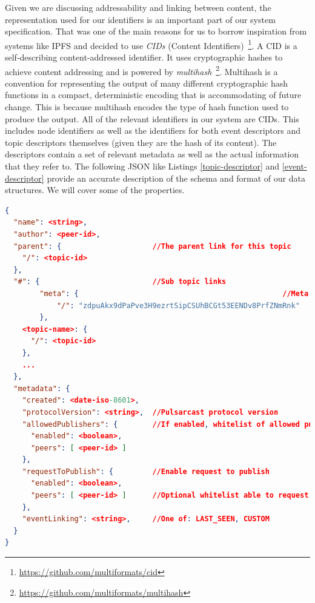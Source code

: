 Given we are discussing addressability and linking between content, the
representation used for our identifiers is an important part of our system
specification. That was one of the main reasons for us to borrow inspiration
from systems like IPFS and decided to use \emph{CIDs} (Content
Identifiers)~\footnote{\url{https://github.com/multiformats/cid}}.  A CID is a
self-describing content-addressed identifier. It uses cryptographic hashes to
achieve content addressing and is powered by
\emph{multihash}~\footnote{\url{https://github.com/multiformats/multihash}}.
Multihash is a convention for representing the output of many different
cryptographic hash functions in a compact, deterministic encoding that is
accommodating of future change. This is because multihash encodes the type of
hash function used to produce the output. All of the relevant identifiers in
our system are CIDs. This includes node identifiers as well as the identifiers
for both event descriptors and topic descriptors themselves (given they are the
hash of its content). The descriptors contain a set of relevant metadata as
well as the actual information that they refer to. The following JSON like
Listings \ref{topic-descriptor} and \ref{event-descriptor} provide an accurate
description of the schema and format of our data structures. We will cover some
of the properties.

\begin{lstlisting}[float, language=JSON,caption={Topic descriptor schema in a JSON based format},label={topic-descriptor}]
{
  "name": <string>,
  "author": <peer-id>,
  "parent": {                     //The parent link for this topic
    "/": <topic-id>
  },
  "#": {                          //Sub topic links
		"meta": {												//Meta topic
			"/": "zdpuAkx9dPaPve3H9ezrtSipCSUhBCGt53EENDv8PrfZNmRnk"
		},
    <topic-name>: {
      "/": <topic-id>
    },
    ...
  },
  "metadata": {
    "created": <date-iso-8601>,
    "protocolVersion": <string>,  //Pulsarcast protocol version
    "allowedPublishers": {        //If enabled, whitelist of allowed publishers
      "enabled": <boolean>,
      "peers": [ <peer-id> ]
    },
    "requestToPublish": {         //Enable request to publish
      "enabled": <boolean>,
      "peers": [ <peer-id> ]      //Optional whitelist able to request
    },
    "eventLinking": <string>,     //One of: LAST_SEEN, CUSTOM
  }
}
\end{lstlisting}

